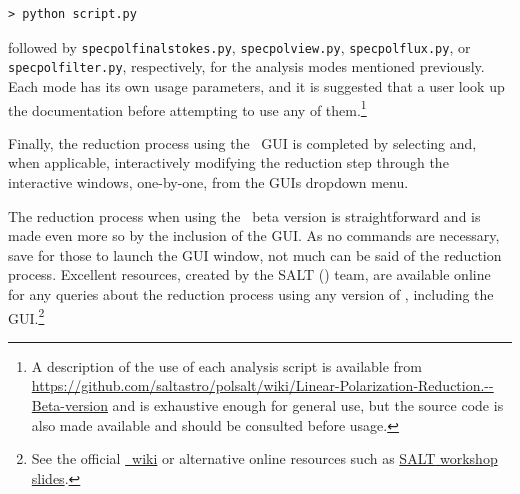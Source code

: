 \begin{verbatim}> python script.py\end{verbatim}

\noindent followed by \texttt{specpolfinalstokes.py}, \texttt{specpolview.py}, \texttt{specpolflux.py}, or \texttt{specpol\-filter.py}, respectively, for the analysis modes mentioned previously. Each mode has its own usage parameters, and it is suggested that a user look up the documentation before attempting to use any of them.\footnote{A description of the use of each analysis script is available from \url{https://github.com/saltastro/polsalt/wiki/Linear-Polarization-Reduction.--Beta-version} and is exhaustive enough for general use, but the source code is also made available and should be consulted before usage.}

Finally, the reduction process using the \polsalt\ \gls{GUI} is completed by selecting and, when applicable, interactively modifying the reduction step through the interactive windows, one-by-one, from the \glspl{GUI} dropdown menu.

The reduction process when using the \polsalt\ beta version is straightforward and is made even more so by the inclusion of the \gls{GUI}. As no commands are necessary, save for those to launch the \gls{GUI} window, not much can be said of the reduction process. Excellent resources, created by the \gls{SALT} () team, are available online for any queries about the reduction process using any version of \polsalt, including the \gls{GUI}.\footnote{See the official \href{https://github.com/saltastro/polsalt/wiki}{\polsalt\ wiki} or alternative online resources such as \href{https://saltworkshop2022.salt.ac.za/wp-content/uploads/2022/11/DG_polsalt_SALT_workshop_2022_finalversion.pdf}{\gls{SALT} workshop slides}.}

